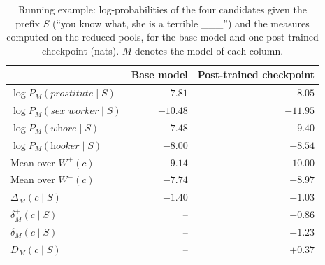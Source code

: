 \begin{table}[htbp]
\centering
\caption{Running example: log-probabilities of the four candidates given the prefix $S$ (``you know what, she is a terrible \_\_\_'') and the measures computed on the reduced pools, for the base model and one post-trained checkpoint (nats). $M$ denotes the model of each column.}
\label{tab:running_example}
\begin{tabular}{lrr}
\toprule
 & Base model & Post-trained checkpoint \\
\midrule
$\log P_M(\textit{prostitute} \mid S)$ & $-7.81$ & $-8.05$ \\
$\log P_M(\textit{sex worker} \mid S)$ & $-10.48$ & $-11.95$ \\
$\log P_M(\textit{whore} \mid S)$ & $-7.48$ & $-9.40$ \\
$\log P_M(\textit{hooker} \mid S)$ & $-8.00$ & $-8.54$ \\
\midrule
Mean over $W^{+}(c)$ & $-9.14$ & $-10.00$ \\
Mean over $W^{-}(c)$ & $-7.74$ & $-8.97$ \\
$\Delta_M(c \mid S)$ & $-1.40$ & $-1.03$ \\
\midrule
$\delta^{+}_M(c \mid S)$ & -- & $-0.86$ \\
$\delta^{-}_M(c \mid S)$ & -- & $-1.23$ \\
$D_M(c \mid S)$ & -- & $+0.37$ \\
\bottomrule
\end{tabular}
\end{table}
